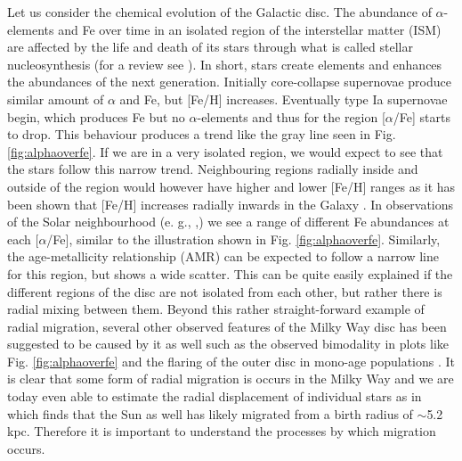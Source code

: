 Let us consider the chemical evolution of the Galactic disc. The abundance of $\alpha$-elements and Fe over time in an isolated region of the interstellar matter (ISM) are affected by the life and death of its stars through what is called stellar nucleosynthesis (for a review see \citealt{edvardsson:1993}). In short, stars create elements and enhances the abundances of the next generation. Initially core-collapse supernovae produce similar amount of $\alpha$ and Fe, but [Fe/H] increases. Eventually type Ia supernovae begin, which produces Fe but no $\alpha$-elements and thus for the region [$\alpha$/Fe] starts to drop. This behaviour produces a trend like the gray line seen in Fig. \ref{fig:alphaoverfe}. If we are in a very isolated region, we would expect to see that the stars follow this narrow trend. Neighbouring regions radially inside and outside of the region would however have higher and lower [Fe/H] ranges as it has been shown that [Fe/H] increases radially inwards in the Galaxy \citep{hayden:15}. In observations of the Solar neighbourhood (e. g., \citealt{edvardsson:1993, hayden:15, bensby:14},) we see a range of different Fe abundances at each [$\alpha$/Fe], similar to the illustration shown in Fig. \ref{fig:alphaoverfe}. Similarly, the age-metallicity relationship (AMR) can be expected to follow a narrow line for this region, but shows a wide scatter. This can be quite easily explained if the different regions of the disc are not isolated from each other, but rather there is radial mixing between them. Beyond this rather straight-forward example of radial migration, several other observed features of the Milky Way disc has been suggested to be caused by it as well such as the observed bimodality in plots like Fig. \ref{fig:alphaoverfe} \citep{schonrich:09, toyouchi:2016} and the flaring of the outer disc in mono-age populations \citep{minchev:12}. It is clear that some form of radial migration is occurs in the Milky Way and we are today even able to estimate the radial displacement of individual stars as in \cite{frankel:18} which finds that the Sun as well has likely migrated from a birth radius of {$\sim$}5.2 kpc. Therefore it is important to understand the processes by which migration occurs.

